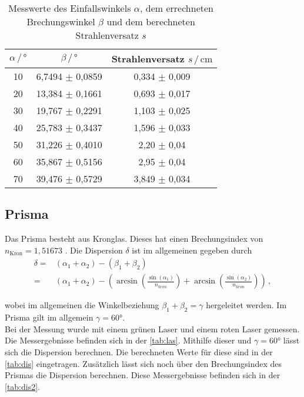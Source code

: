 \begin{table}
    \centering
    \caption{Messwerte des Einfallswinkels $\alpha$, dem errechneten Brechungswinkel $\beta$ und dem berechneten Strahlenversatz $s$}
    \label{tab:beta}
    \begin{tabular}{c c c}
    \toprule
         $\alpha \, / \, ° $ & $\beta \, / \, °$ & Strahlenversatz $s  \, / \, \si{\centi\meter}$\\
    \midrule
    10 & 6,7494 $\pm$ 0,0859  & 0,334 $\pm$ 0,009\\
    20 & 13,384 $\pm$ 0,1661  & 0,693 $\pm$ 0,017\\
    30 & 19,767 $\pm$ 0,2291  & 1,103 $\pm$ 0,025\\
    40 & 25,783 $\pm$ 0,3437  & 1,596 $\pm$ 0,033\\
    50 & 31,226 $\pm$ 0,4010  & 2,20  $\pm$ 0,04\\
    60 & 35,867 $\pm$ 0,5156  & 2,95  $\pm$ 0,04\\
    70 & 39,476 $\pm$ 0,5729  & 3,849 $\pm$ 0,034\\
    \bottomrule
    \end{tabular}
\end{table}

\subsection{Prisma}
Das Prisma besteht aus Kronglas. Dieses hat einen Brechungsindex von $n_\text{Kron} = 1,51673$ \cite{Kronglas}.%
Die Dispersion $\delta$ ist im allgemeinen gegeben durch
\begin{align}
    \delta =& ( \alpha_1 + \alpha_2 ) - ( \beta_1 + \beta_2 ) \\
    =& (\alpha_1+\alpha_2)- \left( \arcsin \left(\frac{\sin(\alpha_1)}{n_{kron}}\right) + \arcsin \left(\frac{\sin(\alpha_2)}{n_{kron}}\right) \right)\, ,
\end{align}

\noindent
wobei im allgemeinen die Winkelbeziehung $\beta_1 + \beta_2 = \gamma$ hergeleitet werden. Im Prisma gilt im allgemein $\gamma = 60°$.\\

\noindent
Bei der Messung wurde mit einem grünen Laser und einem roten Laser gemessen. Die Messergebnisse befinden sich in der \autoref{tab:las}. Mithilfe dieser und $\gamma = 60°$ lässt sich die Dispersion 
berechnen. Die berechneten Werte für diese sind in der \autoref{tab:dis} eingetragen. Zusätzlich lässt sich noch über den Brechungsindex des Prismas die Dispersion berechnen. Diese Messergebnisse 
befinden sich in der \autoref{tab:dis2}.

